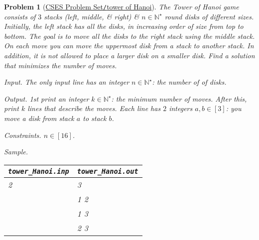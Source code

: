 \documentclass{article}
\newtheorem{problem}{Problem}
\begin{document}
\begin{problem}[\href{https://cses.fi/problemset/task/2165}{CSES Problem Set{\tt/}tower of Hanoi}]
    The Tower of Hanoi game consists of $3$ stacks (left, middle, \& right) \& $n\in\mathbb{N}^\star$ round disks of different sizes. Initially, the left stack has all the disks, in increasing order of size from top to bottom. The goal is to move all the disks to the right stack using the middle stack. On each move you can move the uppermost disk from a stack to another stack. In addition, it is not allowed to place a larger disk on a smaller disk. Find a solution that minimizes the number of moves.
    \item {\sf Input.} The only input line has an integer $n\in\mathbb{N}^\star$: the number of of disks.
    \item {\sf Output.} 1st print an integer $k\in\mathbb{N}^\star$: the minimum number of moves. After this, print $k$ lines that describe the moves. Each line has $2$ integers $a,b\in[3]$: you move a disk from stack $a$ to stack $b$.
    \item {\sf Constraints.} $n\in[16]$.
    \item {\sf Sample.}
    \begin{table}[H]
        \centering
        \begin{tabular}{|l|l|}
            \hline
            \verb|tower_Hanoi.inp| & \verb|tower_Hanoi.out| \\
            \hline
            2 & 3 \\
            & 1 2 \\
            & 1 3 \\
            & 2 3 \\
            \hline
        \end{tabular}
    \end{table}
\end{problem}
\end{document}
